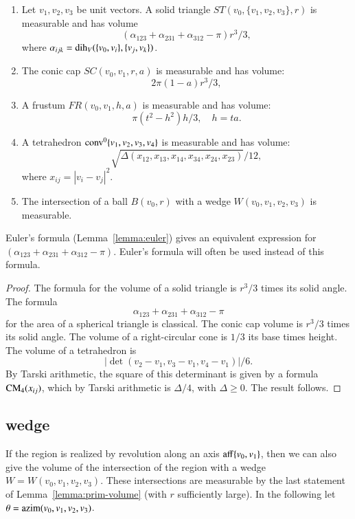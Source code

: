 \begin{lemma} 
\begin{enumerate} 
 \item {} Let $v_1,v_2,v_3$ be unit vectors.
   A solid triangle $ST(v_0,\{v_1,v_2,v_3\},r)$ is measurable and has volume
   $$
   (\alpha_{123}+\alpha_{231}+\alpha_{312}-\pi)r^3/3,
   $$
   where $\alpha_{ijk} = \operatorname{dih}_V(\{v_0,v_i\},\{v_j,v_k\})$.
  \item {} The conic cap $SC(v_0,v_1,r,a)$ is measurable and has volume:
   $$
    2\pi(1-a) r^3/3,
   $$
 \item {} A frustum $FR(v_0,v_1,h,a)$ is measurable and has volume:
   $$
   \pi (t^2-h^2) h/3,\quad h = t a.
   $$
 \item{} A tetrahedron ${\operatorname{conv}}^0\{v_1,v_2,v_3,v_4\}$ is measurable and has volume:
   $$
   \sqrt{\Delta(x_{12},x_{13},x_{14},x_{34},x_{24},x_{23})}/12,
   $$
   where $x_{ij} = |v_i-v_j|^2$.
 \item{} The intersection of a ball $B(v_0,r)$ with a wedge
 $W(v_0,v_1,v_2,v_3)$ is measurable.
\end{enumerate}
\end{lemma}

Euler's formula (Lemma~\ref{lemma:euler}) gives an
equivalent expression for $(\alpha_{123}+\alpha_{231}+\alpha_{312}-\pi)$.
Euler's formula will often be used instead of this formula.

\begin{proof}
The formula for the volume of a solid triangle is $r^3/3$ times
its solid angle.  The formula 
   $$\alpha_{123}+\alpha_{231}+\alpha_{312}-\pi$$
for the area of a spherical triangle is classical.    
The conic cap volume is
$r^3/3$ times its solid angle.  
The volume of a right-circular cone is $1/3$ its base times height.
The volume of a tetrahedron is
   $$|\det(v_2-v_1,v_3-v_1,v_4-v_1)|/6.$$
By Tarski arithmetic, 
the square of this determinant is given by a formula
${\operatorname{CM}}_4(x_{ij})$, which by Tarski arithmetic is
$\Delta/4$, with $\Delta\ge0$.  The result follows.
\end{proof}



\subsection{wedge}\label{sec:wedge}

If the region is realized by revolution along an axis ${\operatorname{aff}}\{v_0,v_1\}$, 
then
we can also give the volume of the intersection of the region
with a wedge $W=W(v_0,v_1,v_2,v_3)$.  These intersections are measurable
by the last statement of Lemma~\ref{lemma:prim-volume} (with $r$ sufficiently
large).
  In the following
let $\theta = {\operatorname{azim}}(v_0,v_1,v_2,v_3)$.


